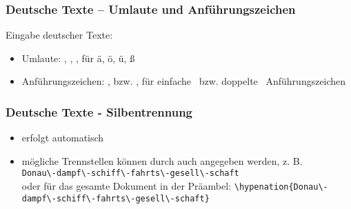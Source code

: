 \begin{frame}[fragile]
	\frametitle{Deutsche Texte -- Umlaute und Anführungszeichen}
	
	Eingabe deutscher Texte:
	\begin{itemize}
		\item Umlaute: , , ,  für ä, ö, ü, ß
		\item Anführungszeichen: ,  bzw. ,  für \glq einfache\grq~ bzw. \glqq doppelte\grqq~ Anführungszeichen
	\end{itemize}
	\vfill
	
	\vfill
\end{frame}

\begin{frame}[fragile]
	\frametitle{Deutsche Texte - Silbentrennung}
	\begin{itemize}
		\item erfolgt automatisch
		\item mögliche Trennstellen können  durch \befehl{-} auch angegeben werden, z. B.\\
		\lstinline$Donau\-dampf\-schiff\-fahrts\-gesell\-schaft$\\
		oder für das gesamte Dokument in der Präambel:
		\lstinline$\hypenation{Donau\-dampf\-schiff\-fahrts\-gesell\-schaft}$
	\end{itemize}

\end{frame}
